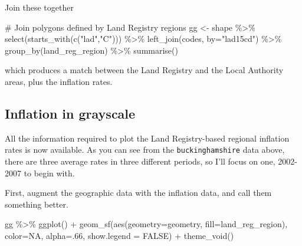 \documentclass[
  letterpaper,
]{book}
\newenvironment{Shaded}{\begin{snugshade}}{\end{snugshade}}
\newcommand{\AttributeTok}[1]{\textcolor[rgb]{0.40,0.45,0.13}{#1}}
\newcommand{\CommentTok}[1]{\textcolor[rgb]{0.37,0.37,0.37}{#1}}
\newcommand{\ConstantTok}[1]{\textcolor[rgb]{0.56,0.35,0.01}{#1}}
\newcommand{\DecValTok}[1]{\textcolor[rgb]{0.68,0.00,0.00}{#1}}
\newcommand{\FunctionTok}[1]{\textcolor[rgb]{0.28,0.35,0.67}{#1}}
\newcommand{\NormalTok}[1]{\textcolor[rgb]{0.00,0.23,0.31}{#1}}
\newcommand{\OtherTok}[1]{\textcolor[rgb]{0.00,0.23,0.31}{#1}}
\newcommand{\SpecialCharTok}[1]{\textcolor[rgb]{0.37,0.37,0.37}{#1}}
\newcommand{\StringTok}[1]{\textcolor[rgb]{0.13,0.47,0.30}{#1}}
\begin{document}
Join these together

\begin{Shaded}
\begin{Highlighting}[]
\CommentTok{\# Join polygons defined by Land Registry regions}
\NormalTok{gg }\OtherTok{\textless{}{-}}\NormalTok{ shape }\SpecialCharTok{\%\textgreater{}\%}
  \FunctionTok{select}\NormalTok{(}\FunctionTok{starts\_with}\NormalTok{(}\FunctionTok{c}\NormalTok{(}\StringTok{"lad"}\NormalTok{,}\StringTok{"C"}\NormalTok{))) }\SpecialCharTok{\%\textgreater{}\%} 
  \FunctionTok{left\_join}\NormalTok{(codes, }\AttributeTok{by=}\StringTok{"lad15cd"}\NormalTok{) }\SpecialCharTok{\%\textgreater{}\%}
  \FunctionTok{group\_by}\NormalTok{(land\_reg\_region) }\SpecialCharTok{\%\textgreater{}\%}
  \FunctionTok{summarise}\NormalTok{() }
\end{Highlighting}
\end{Shaded}

which produces a match between the Land Registry and the Local Authority
areas, plus the inflation rates.

\hypertarget{inflation-in-grayscale}{%
\subsection{Inflation in grayscale}\label{inflation-in-grayscale}}

All the information required to plot the Land Registry-based regional
inflation rates is now available. As you can see from the
\texttt{buckinghamshire} data above, there are three average rates in
three different periods, so I'll focus on one, 2002-2007 to begin with.

First, augment the geographic data with the inflation data, and call
them something better.

\begin{Shaded}
\begin{Highlighting}[]
\NormalTok{gg }\SpecialCharTok{\%\textgreater{}\%}
  \FunctionTok{ggplot}\NormalTok{() }\SpecialCharTok{+}
  \FunctionTok{geom\_sf}\NormalTok{(}\FunctionTok{aes}\NormalTok{(}\AttributeTok{geometry=}\NormalTok{geometry, }\AttributeTok{fill=}\NormalTok{land\_reg\_region), }
          \AttributeTok{color=}\ConstantTok{NA}\NormalTok{, }\AttributeTok{alpha=}\NormalTok{.}\DecValTok{66}\NormalTok{, }\AttributeTok{show.legend =} \ConstantTok{FALSE}\NormalTok{) }\SpecialCharTok{+}
  \FunctionTok{theme\_void}\NormalTok{()}
\end{Highlighting}
\end{Shaded}
\end{document}

